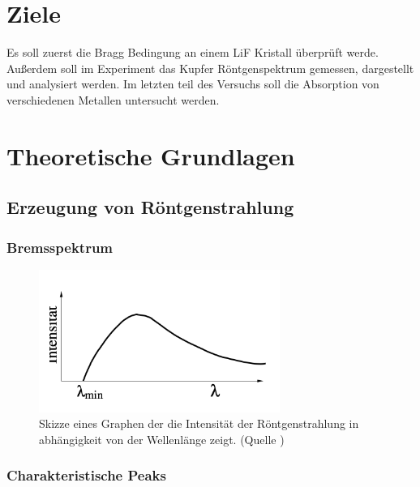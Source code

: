 \section{Ziele}
\label{sec:ziele}
Es soll zuerst die Bragg Bedingung an einem LiF Kristall überprüft werde.
Außerdem soll im Experiment das Kupfer Röntgenspektrum gemessen, dargestellt und analysiert werden.
Im letzten teil des Versuchs soll die Absorption von verschiedenen Metallen untersucht werden.
\section{Theoretische Grundlagen}
\label{sec:theorie}

\subsection{Erzeugung von Röntgenstrahlung}
\subsubsection{Bremsspektrum}
\begin{figure}
    \centering
    \includegraphics[width=0.7\textwidth]{bilder/Bremsspektrum.png}
    \caption{Skizze eines Graphen der die Intensität der Röntgenstrahlung in abhängigkeit von der Wellenlänge zeigt. (Quelle \cite{Anleitung})}
    \label{fig:Bremsspektrum}
\end{figure}
\subsubsection{Charakteristische Peaks}

